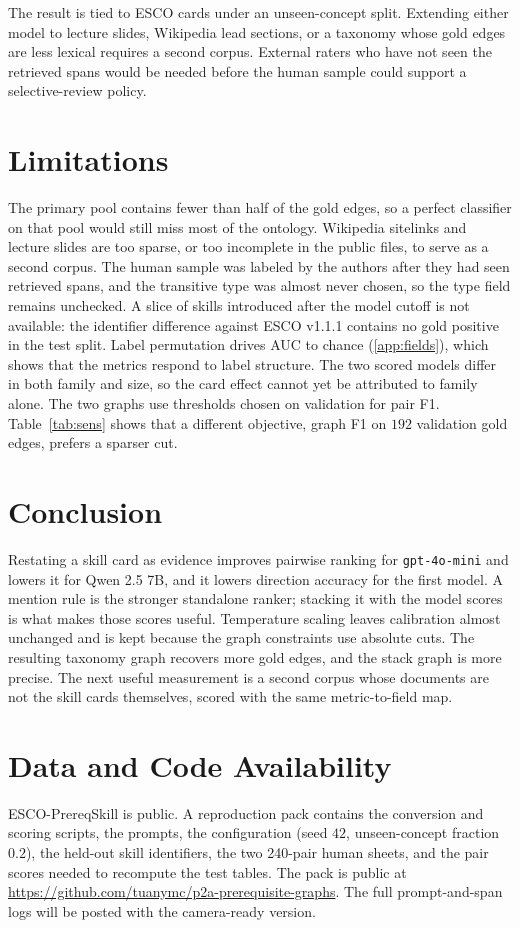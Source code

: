 \documentclass{ws-ijait}
\begin{document}
The result is tied to {ESCO} cards under an unseen-concept split.
Extending either model to lecture slides, Wikipedia lead sections,
or a taxonomy whose gold edges are less lexical requires a second
corpus.
External raters who have not seen the retrieved spans would be
needed before the human sample could support a selective-review
policy.

\section{Limitations}
\label{sec:limit}
The primary pool contains fewer than half of the gold edges, so a
perfect classifier on that pool would still miss most of the
ontology.
Wikipedia sitelinks and lecture slides are too sparse, or too
incomplete in the public files, to serve as a second corpus.
The human sample was labeled by the authors after they had seen
retrieved spans, and the transitive type was almost never chosen, so
the type field remains unchecked.
A slice of skills introduced after the model cutoff is not
available: the identifier difference against {ESCO} v1.1.1 contains
no gold positive in the test split.
Label permutation drives {AUC} to chance
(\ref{app:fields}), which shows that the metrics respond
to label structure.
The two scored models differ in both family and size, so the card
effect cannot yet be attributed to family alone.
The two graphs use thresholds chosen on validation for pair {F1}.
Table~\ref{tab:sens} shows that a different objective, graph {F1} on
$192$ validation gold edges, prefers a sparser cut.

\section{Conclusion}
\label{sec:conclusion}
Restating a skill card as evidence improves pairwise ranking for
\texttt{gpt-4o-mini} and lowers it for {Qwen} 2.5 7B, and it lowers
direction accuracy for the first model.
A mention rule is the stronger standalone ranker; stacking it with
the model scores is what makes those scores useful.
Temperature scaling leaves calibration almost unchanged and is kept
because the graph constraints use absolute cuts.
The resulting taxonomy graph recovers more gold edges, and the stack
graph is more precise.
The next useful measurement is a second corpus whose documents are
not the skill cards themselves, scored with the same metric-to-field
map.

\section*{Data and Code Availability}
{ESCO-PrereqSkill} is public\cite{Le_2025}.
A reproduction pack contains the conversion and scoring scripts, the
prompts, the configuration (seed $42$, unseen-concept fraction
$0.2$), the held-out skill identifiers, the two 240-pair human
sheets, and the pair scores needed to recompute the test tables.
The pack is public at
\url{https://github.com/tuanymc/p2a-prerequisite-graphs}.
The full prompt-and-span logs will be posted with the camera-ready
version.
\end{document}
